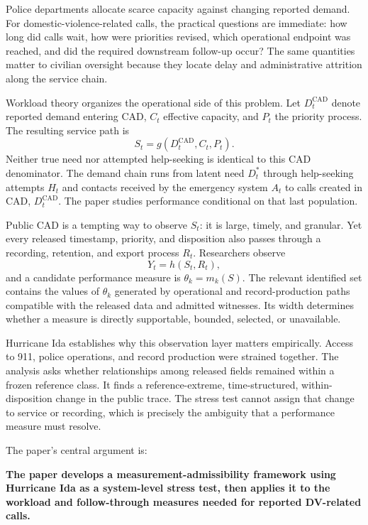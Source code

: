 \documentclass[11pt]{article}
\begin{document}
Police departments allocate scarce capacity against changing reported demand. For domestic-violence-related calls, the practical questions are immediate: how long did calls wait, how were priorities revised, which operational endpoint was reached, and did the required downstream follow-up occur? The same quantities matter to civilian oversight because they locate delay and administrative attrition along the service chain.

Workload theory organizes the operational side of this problem. Let $D_t^{\mathrm{CAD}}$ denote reported demand entering CAD, $C_t$ effective capacity, and $P_t$ the priority process. The resulting service path is
\begin{equation}
S_t=g(D_t^{\mathrm{CAD}},C_t,P_t).
\label{eq:workload_layer}
\end{equation}
Neither true need nor attempted help-seeking is identical to this CAD denominator. The demand chain runs from latent need $D_t^*$ through help-seeking attempts $H_t$ and contacts received by the emergency system $A_t$ to calls created in CAD, $D_t^{\mathrm{CAD}}$. The paper studies performance conditional on that last population.

Public CAD is a tempting way to observe $S_t$: it is large, timely, and granular. Yet every released timestamp, priority, and disposition also passes through a recording, retention, and export process $R_t$. Researchers observe
\begin{equation}
Y_t=h(S_t,R_t),
\label{eq:observation_layer}
\end{equation}
and a candidate performance measure is $\theta_k=m_k(S)$. The relevant identified set contains the values of $\theta_k$ generated by operational and record-production paths compatible with the released data and admitted witnesses. Its width determines whether a measure is directly supportable, bounded, selected, or unavailable.

Hurricane Ida establishes why this observation layer matters empirically. Access to 911, police operations, and record production were strained together. The analysis asks whether relationships among released fields remained within a frozen reference class. It finds a reference-extreme, time-structured, within-disposition change in the public trace. The stress test cannot assign that change to service or recording, which is precisely the ambiguity that a performance measure must resolve.

The paper's central argument is:

\begin{resultbox}
\textbf{The paper develops a measurement-admissibility framework using Hurricane Ida as a system-level stress test, then applies it to the workload and follow-through measures needed for reported DV-related calls.}
\end{resultbox}
\end{document}
